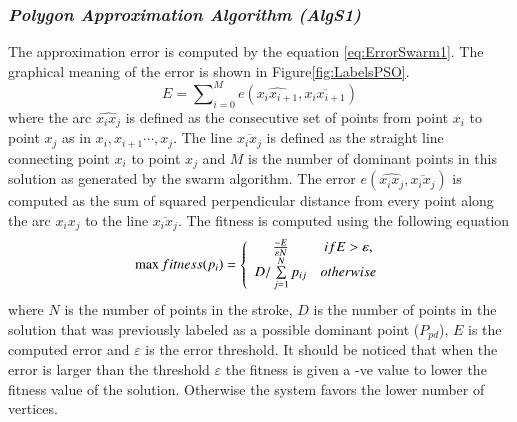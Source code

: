 \documentclass[preprint,10pt,5p,twocolumn]{elsarticle}
\begin{document}
\subsubsection{\textit{Polygon Approximation Algorithm \textsl{(AlgS1)}}}
The approximation error is computed by the equation \ref{eq:ErrorSwarm1}. The graphical meaning of the error is shown in Figure\ref{fig:LabelsPSO}.
\begin{equation}
E=\sum\nolimits_{i = 0}^M e ( \widehat{x_ix_{i+1}},\overline{x_i x_{i+1}})
\label{eq:ErrorSwarm1}
\end{equation} where the arc $\widehat{x_ix_j}$ is defined as the consecutive set of points from point $x_i$ to point $x_{j}$ as in $x_i,x_{i+1} \cdots,x_j$. The line $\overline{x_i x_j}$ is defined as the straight line connecting point $x_i$ to point $x_j$ and $M$ is the number of dominant points in this solution as generated by the swarm algorithm. The error $e ( \widehat{x_ix_j},\overline{x_i x_j})$ is computed as the sum of squared perpendicular distance from every point along the arc $\widehat{x_ix_j}$ to the line $\overline{x_i x_j}$. The fitness is computed using the following equation %
\begin{equation}
\max fitness(p_i ) = \left\{ {\begin{array}{*{20}c}
   {\frac{-E}{\varepsilon N}} & {ifE > \varepsilon ,}  \\
   
   {D/\sum\limits_{j = 1}^N {p_{ij} } } & {otherwise}  \\
\end{array}} \right.
\label{eq:fitnessSwarm1}
\end{equation} where $N$ is the number of points in the stroke, $D$ is the number of points in the solution that was previously labeled as a possible dominant point ($P_{pd}$), $E$ is the computed error and $\varepsilon$ is the error threshold. It should be noticed that when the error is larger than the threshold $\varepsilon$ the fitness is given a -ve value to lower the fitness value of the solution. Otherwise the system favors the lower number of vertices.
\end{document}
